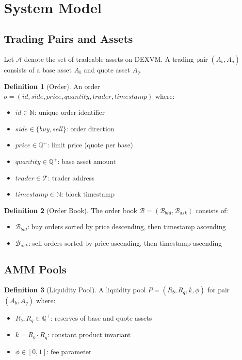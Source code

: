 \documentclass[11pt,a4paper]{article}
\theoremstyle{definition}
\newtheorem{definition}{Definition}
\begin{document}
\section{System Model}

\subsection{Trading Pairs and Assets}

Let $\mathcal{A}$ denote the set of tradeable assets on DEXVM. A trading pair $(A_b, A_q)$ consists of a base asset $A_b$ and quote asset $A_q$.

\begin{definition}[Order]
An order $o = (id, side, price, quantity, trader, timestamp)$ where:
\begin{itemize}
    \item $id \in \mathbb{N}$: unique order identifier
    \item $side \in \{buy, sell\}$: order direction
    \item $price \in \mathbb{Q}^+$: limit price (quote per base)
    \item $quantity \in \mathbb{Q}^+$: base asset amount
    \item $trader \in \mathcal{T}$: trader address
    \item $timestamp \in \mathbb{N}$: block timestamp
\end{itemize}
\end{definition}

\begin{definition}[Order Book]
The order book $\mathcal{B} = (\mathcal{B}_{bid}, \mathcal{B}_{ask})$ consists of:
\begin{itemize}
    \item $\mathcal{B}_{bid}$: buy orders sorted by price descending, then timestamp ascending
    \item $\mathcal{B}_{ask}$: sell orders sorted by price ascending, then timestamp ascending
\end{itemize}
\end{definition}

\subsection{AMM Pools}

\begin{definition}[Liquidity Pool]
A liquidity pool $P = (R_b, R_q, k, \phi)$ for pair $(A_b, A_q)$ where:
\begin{itemize}
    \item $R_b, R_q \in \mathbb{Q}^+$: reserves of base and quote assets
    \item $k = R_b \cdot R_q$: constant product invariant
    \item $\phi \in [0, 1]$: fee parameter
\end{itemize}
\end{definition}
\end{document}
